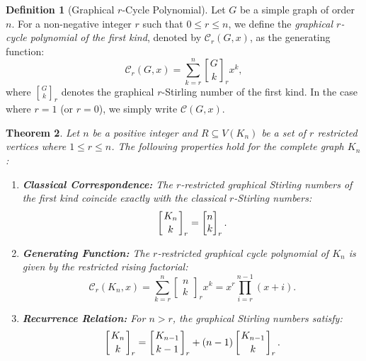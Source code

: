 \documentclass{amsart}
\newcommand{\str}[2]{\left[ \genfrac{}{}{0pt}{}{#1}{#2} \right]_r}
\newcommand{\cyc}{\mathcal{C}}
\newtheorem{theorem}{Theorem}[section]
\theoremstyle{definition}
\newtheorem{definition}[theorem]{Definition}
\def\st#1#2{\begin{bmatrix} #1 \\ #2 \end{bmatrix}}
\begin{document}
\begin{definition}[Graphical $r$-Cycle Polynomial]
Let $G$ be a simple graph of order $n$. For a non-negative integer $r$ such that $0 \leq r \leq n$, we define the \textit{graphical $r$-cycle polynomial of the first kind}, denoted by $\mathcal{C}_r(G, x)$, as the generating function:
\begin{equation*}
    \mathcal{C}_r(G, x) = \sum_{k=r}^{n} {G \brack k}_r x^k,
\end{equation*}
where ${G \brack k}_r$ denotes the graphical $r$-Stirling number of the first kind. In the case where $r=1$ (or $r=0$), we simply write $\mathcal{C}(G, x)$.
\end{definition}

\begin{theorem}
\label{thm:complete_ext}
Let $n$ be a positive integer and $R \subseteq V(K_n)$ be a set of $r$ restricted vertices where $1 \leq r \leq n$. The following properties hold for the complete graph $K_n$:
\begin{enumerate}
    \item[(i)] \textbf{Classical Correspondence:} The $r$-restricted graphical Stirling numbers of the first kind coincide exactly with the classical $r$-Stirling numbers:
    \begin{equation*}
        \str{K_n}{k} = \st{n}{k}_r.
    \end{equation*}
    
    \item[(ii)] \textbf{Generating Function:} The $r$-restricted graphical cycle polynomial of $K_n$ is given by the restricted rising factorial:
    \begin{equation*}
        \cyc_r(K_n, x) = \sum_{k=r}^n \st{n}{k}_r x^k = x^r \prod_{i=r}^{n-1} (x + i).
    \end{equation*}
    
    \item[(iii)] \textbf{Recurrence Relation:} For $n > r$, the graphical Stirling numbers satisfy:
    \begin{equation*}
        \str{K_n}{k} = \str{K_{n-1}}{k-1} + (n-1) \str{K_{n-1}}{k}.
    \end{equation*}
\end{enumerate}
\end{theorem}
\end{document}
